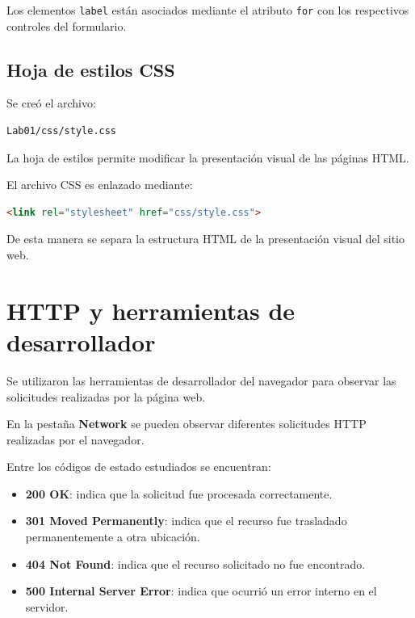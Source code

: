 \documentclass{article}
\begin{document}
Los elementos \texttt{label} están asociados mediante el atributo
\texttt{for} con los respectivos controles del formulario.

\subsection{Hoja de estilos CSS}

Se creó el archivo:

\begin{lstlisting}[language=bash]
Lab01/css/style.css
\end{lstlisting}

La hoja de estilos permite modificar la presentación visual
de las páginas HTML.

El archivo CSS es enlazado mediante:

\begin{lstlisting}[language=HTML]
<link rel="stylesheet" href="css/style.css">
\end{lstlisting}

De esta manera se separa la estructura HTML de la presentación
visual del sitio web.


\section{HTTP y herramientas de desarrollador}

Se utilizaron las herramientas de desarrollador del navegador
para observar las solicitudes realizadas por la página web.

En la pestaña \textbf{Network} se pueden observar diferentes
solicitudes HTTP realizadas por el navegador.

Entre los códigos de estado estudiados se encuentran:

\begin{itemize}

    \item \textbf{200 OK}: indica que la solicitud fue procesada
    correctamente.

    \item \textbf{301 Moved Permanently}: indica que el recurso
    fue trasladado permanentemente a otra ubicación.

    \item \textbf{404 Not Found}: indica que el recurso solicitado
    no fue encontrado.

    \item \textbf{500 Internal Server Error}: indica que ocurrió
    un error interno en el servidor.

\end{itemize}
\end{document}
